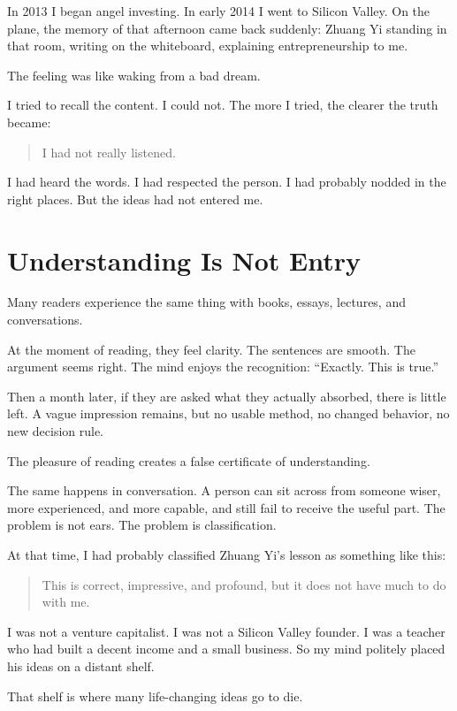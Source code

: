 In 2013 I began angel investing. In early 2014 I went to Silicon Valley. On the plane, the memory of that afternoon came back suddenly: Zhuang Yi standing in that room, writing on the whiteboard, explaining entrepreneurship to me.

The feeling was like waking from a bad dream.

I tried to recall the content. I could not. The more I tried, the clearer the truth became:

\begin{quote}
I had not really listened.
\end{quote}

I had heard the words. I had respected the person. I had probably nodded in the right places. But the ideas had not entered me.

\section*{Understanding Is Not Entry}

Many readers experience the same thing with books, essays, lectures, and conversations.

At the moment of reading, they feel clarity. The sentences are smooth. The argument seems right. The mind enjoys the recognition: ``Exactly. This is true.''

Then a month later, if they are asked what they actually absorbed, there is little left. A vague impression remains, but no usable method, no changed behavior, no new decision rule.

The pleasure of reading creates a false certificate of understanding.

The same happens in conversation. A person can sit across from someone wiser, more experienced, and more capable, and still fail to receive the useful part. The problem is not ears. The problem is classification.

At that time, I had probably classified Zhuang Yi's lesson as something like this:

\begin{quote}
This is correct, impressive, and profound, but it does not have much to do with me.
\end{quote}

I was not a venture capitalist. I was not a Silicon Valley founder. I was a teacher who had built a decent income and a small business. So my mind politely placed his ideas on a distant shelf.

That shelf is where many life-changing ideas go to die.

